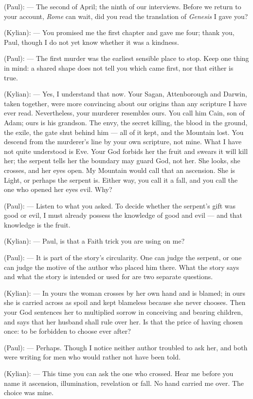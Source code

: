 
\begin{room}

(Paul): --- The second of April; the ninth of our interviews. Before we return to your account, \textit{Rome} can wait, did you read the translation of \textit{Genesis} I gave you?

(Kylian): --- You promised me the first chapter and gave me four; thank you, Paul, though I do not yet know whether it was a kindness.

(Paul): --- The first murder was the earliest sensible place to stop. Keep one thing in mind: a shared shape does not tell you which came first, nor that either is true.

(Kylian): --- Yes, I understand that now. Your Sagan, Attenborough and Darwin, taken together, were more convincing about our origins than any scripture I have ever read. Nevertheless, your murderer resembles ours. You call him Cain, son of Adam; ours is his grandson. The envy, the secret killing, the blood in the ground, the exile, the gate shut behind him --- all of it kept, and the Mountain lost. You descend from the murderer's line by your own scripture, not mine. What I have not quite understood is Eve. Your God forbids her the fruit and swears it will kill her; the serpent tells her the boundary may guard God, not her. She looks, she crosses, and her eyes open. My Mountain would call that an ascension. She is Light, or perhaps the serpent is. Either way, you call it a fall, and you call the one who opened her eyes evil. Why?

(Paul): --- Listen to what you asked. To decide whether the serpent's gift was good or evil, I must already possess the knowledge of good and evil --- and that knowledge is the fruit.

(Kylian): --- Paul, is that a Faith trick you are using on me?

(Paul): --- It is part of the story's circularity. One can judge the serpent, or one can judge the motive of the author who placed him there. What the story says and what the story is intended or used for are two separate questions.

(Kylian): --- In yours the woman crosses by her own hand and is blamed; in ours she is carried across as spoil and kept blameless because she never chooses. Then your God sentences her to multiplied sorrow in conceiving and bearing children, and says that her husband shall rule over her. Is that the price of having chosen once: to be forbidden to choose ever after?

(Paul): --- Perhaps. Though I notice neither author troubled to ask her, and both were writing for men who would rather not have been told.

(Kylian): --- This time you can ask the one who crossed. Hear me before you name it ascension, illumination, revelation or fall. No hand carried me over. The choice was mine.

\end{room}

